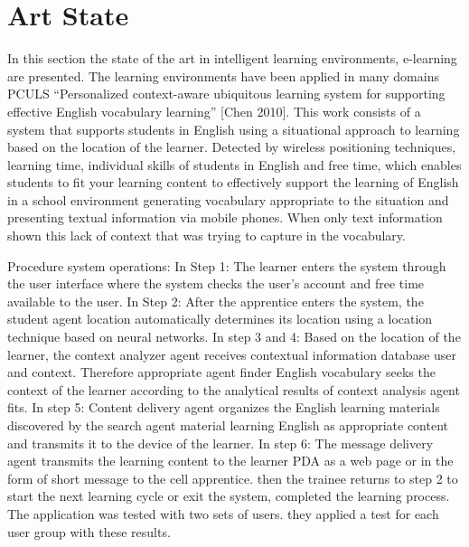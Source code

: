\chapter{Art State} \label{artstate} 
In this section the state of the art in intelligent learning environments, e-learning are presented. The learning environments have been applied in
many domains
PCULS
“Personalized context-aware ubiquitous learning system for supporting effective English vocabulary learning” [Chen 2010]. This work consists of a system that supports students in English using a situational approach to learning based on the location of the learner. Detected by wireless positioning techniques, learning time, individual skills of students in English and free time, which enables students to fit your learning content to effectively support the learning of English in a school environment generating vocabulary appropriate to the situation and presenting textual information via mobile phones. When only text information shown this lack of context that was trying to capture in the vocabulary.
 

Procedure system operations:
In Step 1: The learner enters the system through the user interface where the system checks the user's account and free time available to the user.
In Step 2: After the apprentice enters the system, the student agent location automatically determines its location using a location technique based on neural networks.
In step 3 and 4: Based on the location of the learner, the context analyzer agent receives contextual information database user and context. Therefore appropriate agent finder English vocabulary seeks the context of the learner according to the analytical results of context analysis agent fits.
In step 5: Content delivery agent organizes the English learning materials discovered by the search agent material learning English as appropriate content and transmits it to the device of the learner.
In step 6: The message delivery agent transmits the learning content to the learner PDA as a web page or in the form of short message to the cell apprentice. then the trainee returns to step 2 to start the next learning cycle or exit the system, completed the learning process.
The application was tested with two sets of users. they applied a test for each user group with these results.
 
